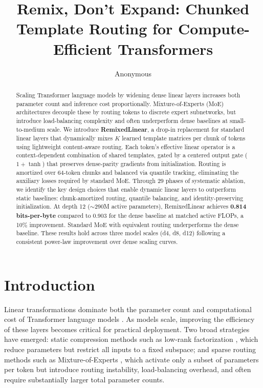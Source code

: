 \documentclass[11pt]{article}
\title{Remix, Don't Expand: Chunked Template Routing for Compute-Efficient Transformers}
\author{Anonymous}
\begin{document}
\maketitle

\begin{abstract}
Scaling Transformer language models by widening dense linear layers increases both parameter count and inference cost proportionally. Mixture-of-Experts (MoE) architectures decouple these by routing tokens to discrete expert subnetworks, but introduce load-balancing complexity and often underperform dense baselines at small-to-medium scale. We introduce \textbf{RemixedLinear}, a drop-in replacement for standard linear layers that dynamically mixes $K$ learned template matrices per chunk of tokens using lightweight content-aware routing. Each token's effective linear operator is a context-dependent combination of shared templates, gated by a centered output gate ($1 + \tanh$) that preserves dense-parity gradients from initialization. Routing is amortized over 64-token chunks and balanced via quantile tracking, eliminating the auxiliary losses required by standard MoE. Through 29 phases of systematic ablation, we identify the key design choices that enable dynamic linear layers to outperform static baselines: chunk-amortized routing, quantile balancing, and identity-preserving initialization. At depth 12 ($\sim$290M active parameters), RemixedLinear achieves \textbf{0.814 bits-per-byte} compared to 0.903 for the dense baseline at matched active FLOPs, a 10\% improvement. Standard MoE with equivalent routing underperforms the dense baseline. These results hold across three model scales (d4, d8, d12) following a consistent power-law improvement over dense scaling curves.
\end{abstract}

\section{Introduction}

Linear transformations dominate both the parameter count and computational cost of Transformer language models \citep{vaswani2017attention}. As models scale, improving the efficiency of these layers becomes critical for practical deployment. Two broad strategies have emerged: static compression methods such as low-rank factorization \citep{hu2021lora}, which reduce parameters but restrict all inputs to a fixed subspace; and sparse routing methods such as Mixture-of-Experts \citep{shazeer2017outrageously, fedus2022switch}, which activate only a subset of parameters per token but introduce routing instability, load-balancing overhead, and often require substantially larger total parameter counts.
\end{document}
